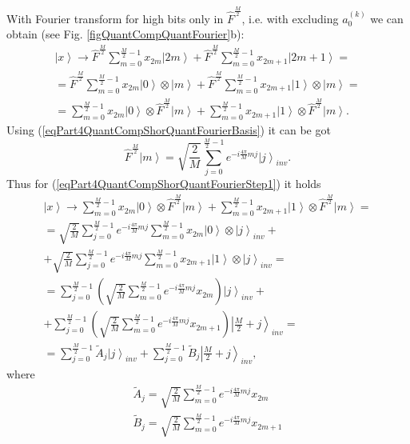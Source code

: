 \documentclass{llncs}
\begin{document}
With Fourier transform for high bits only in $\hat{F}^{\frac{M}{2}}$,
i.e. with excluding $a^{(k)}_0$ we can obtain (see
Fig. \ref{figQuantCompQuantFourier}b): 
\begin{eqnarray}
\left|x\right> \rightarrow
\hat{F}^{\frac{M}{2}} \sum_{m = 0}^{\frac{M}{2} - 1}x_{2m} \left|2m\right> +
\hat{F}^{\frac{M}{2}} \sum_{m = 0}^{\frac{M}{2} - 1}x_{2m + 1}
\left|2m+1\right> = 
\nonumber \\
=
\hat{F}^{\frac{M}{2}} \sum_{m = 0}^{\frac{M}{2} - 1}x_{2m} 
\left|0\right> \otimes  \left|m\right> +
\hat{F}^{\frac{M}{2}} \sum_{m = 0}^{\frac{M}{2} - 1}x_{2m + 1}
\left|1\right> \otimes  \left|m\right>
=
\nonumber \\
=
\sum_{m = 0}^{\frac{M}{2} - 1}x_{2m} 
\left|0\right> \otimes \hat{F}^{\frac{M}{2}} \left|m\right> +
\sum_{m = 0}^{\frac{M}{2} - 1}x_{2m + 1}
\left|1\right> \otimes \hat{F}^{\frac{M}{2}} \left|m\right>.
\label{eqPart4QuantCompShorQuantFourierStep1}
\end{eqnarray}
Using (\ref{eqPart4QuantCompShorQuantFourierBasis}) it can be got
\begin{equation}
\hat{F}^{\frac{M}{2}} \left|m\right> = \sqrt{\frac{2}{M}}
\sum_{j= 0}^{\frac{M}{2} - 1} e^{-i \frac{4 \pi}{M} m j}\left|j\right>_{inv}.
\nonumber
\end{equation}
Thus for (\ref{eqPart4QuantCompShorQuantFourierStep1}) it holds
\begin{eqnarray}
\left|x\right> \rightarrow
\sum_{m = 0}^{\frac{M}{2} - 1}x_{2m} 
\left|0\right> \otimes \hat{F}^{\frac{M}{2}} \left|m\right> +
\sum_{m = 0}^{\frac{M}{2} - 1}x_{2m + 1}
\left|1\right> \otimes \hat{F}^{\frac{M}{2}} \left|m\right> = 
\nonumber \\
=
\sqrt{\frac{2}{M}} \sum_{j = 0}^{\frac{M}{2} - 1} e^{-i \frac{4 \pi}{M} m j} 
\sum_{m = 0}^{\frac{M}{2} - 1}x_{2m} \left|0\right> \otimes
\left|j\right>_{inv}
+
\nonumber \\
+
\sqrt{\frac{2}{M}} \sum_{j = 0}^{\frac{M}{2} - 1} e^{-i \frac{4 \pi}{M} m j} 
\sum_{m = 0}^{\frac{M}{2} - 1}x_{2m+1} \left|1\right> \otimes
\left|j\right>_{inv}
=
\nonumber \\
=
\sum_{j = 0}^{\frac{M}{2} - 1}  
\left( \sqrt{\frac{2}{M}} 
\sum_{m = 0}^{\frac{M}{2} - 1} e^{-i \frac{4 \pi}{M} m j} x_{2m} 
\right) \left|j\right>_{inv}
+
\nonumber \\
+
\sum_{j = 0}^{\frac{M}{2} - 1}
\left( \sqrt{\frac{2}{M}}  
\sum_{m = 0}^{\frac{M}{2} - 1}e^{-i \frac{4 \pi}{M} m j} x_{2m+1} 
\right)
\left|\frac{M}{2} + j\right>_{inv}
=
\nonumber \\
= \sum^{\frac{M}{2} - 1}_{j = 0}  \tilde{A}_{j} \left|j\right>_{inv} +
\sum^{\frac{M}{2} - 1}_{j = 0}  \tilde{B}_{j} \left|\frac{M}{2} + j\right>_{inv},
\label{eqStep1}
\end{eqnarray}
where
\begin{eqnarray}
\tilde{A}_{j} = 
\sqrt{\frac{2}{M}} 
\sum_{m = 0}^{\frac{M}{2} - 1} e^{-i \frac{4 \pi}{M} m j} x_{2m} 
\nonumber \\
\tilde{B}_{j} =
\sqrt{\frac{2}{M}} 
\sum_{m = 0}^{\frac{M}{2} - 1} e^{-i \frac{4 \pi}{M} m j} x_{2m+1} 
\label{eqPart4QuantCompShorAB}
\end{eqnarray}
\end{document}
